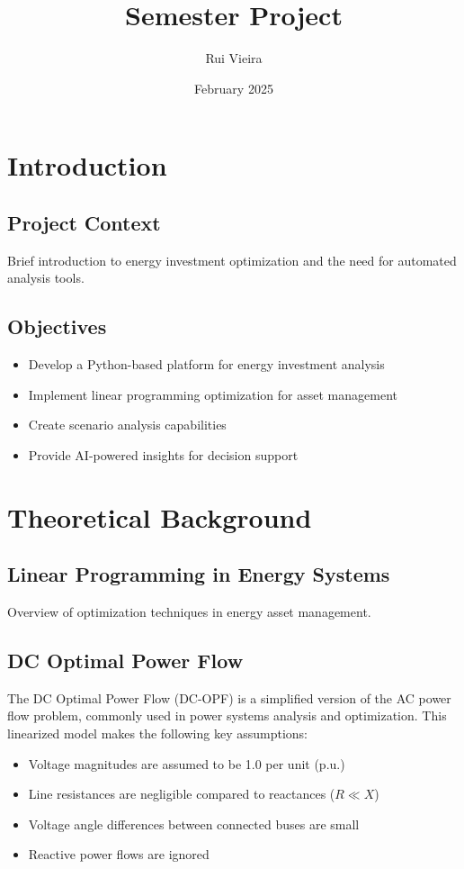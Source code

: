\documentclass{article}
\title{Semester Project}
\author{Rui Vieira}
\date{February 2025}
\begin{document}


\tableofcontents
\newpage

\section{Introduction}
\subsection{Project Context}
Brief introduction to energy investment optimization and the need for automated analysis tools.

\subsection{Objectives}
\begin{itemize}
    \item Develop a Python-based platform for energy investment analysis
    \item Implement linear programming optimization for asset management
    \item Create scenario analysis capabilities
    \item Provide AI-powered insights for decision support
\end{itemize}
\newpage

\section{Theoretical Background}
\subsection{Linear Programming in Energy Systems}
Overview of optimization techniques in energy asset management.

\subsection{DC Optimal Power Flow}
The DC Optimal Power Flow (DC-OPF) is a simplified version of the AC power flow problem, commonly used in power systems analysis and optimization. This linearized model makes the following key assumptions:

\begin{itemize}
    \item Voltage magnitudes are assumed to be 1.0 per unit (p.u.)
    \item Line resistances are negligible compared to reactances ($R \ll X$)
    \item Voltage angle differences between connected buses are small
    \item Reactive power flows are ignored
\end{itemize}
\end{document}
